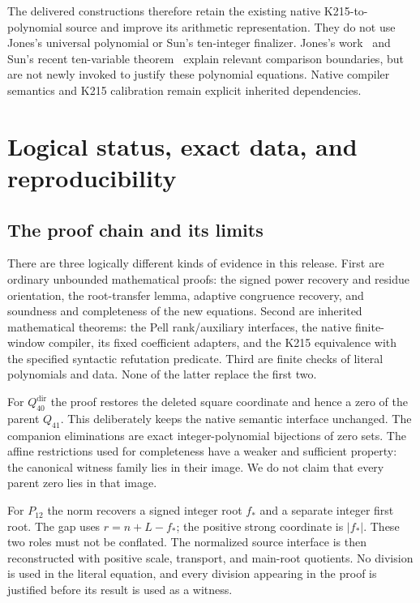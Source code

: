 \documentclass[11pt,letterpaper]{article}
\theoremstyle{remark}
\begin{document}
The delivered constructions therefore retain the existing native
K215-to-polynomial source and improve its arithmetic representation.
They do not use Jones's universal polynomial or Sun's ten-integer
finalizer.  Jones's work~\cite{jones} and Sun's recent ten-variable
theorem~\cite{sun} explain relevant comparison boundaries, but are not
newly invoked to justify these polynomial equations.  Native
compiler semantics and K215 calibration remain explicit inherited
dependencies.





\section{Logical status, exact data, and reproducibility}
\label{sec:evidence}

\subsection{The proof chain and its limits}

There are three logically different kinds of evidence in this release.
First are ordinary unbounded mathematical proofs: the signed power
recovery and residue orientation, the root-transfer lemma, adaptive
congruence recovery, and soundness and completeness of the new
equations.  Second are inherited mathematical theorems: the Pell
rank/auxiliary interfaces, the native finite-window compiler, its fixed
coefficient adapters, and the K215 equivalence with the specified
syntactic refutation predicate.  Third are finite checks of literal
polynomials and data.  None of the latter replace the first two.

For $Q_{40}^{\mathrm{dir}}$ the proof restores the deleted square coordinate and hence
a zero of the parent $Q_{41}$.  This deliberately keeps the native
semantic interface unchanged.  The companion eliminations are exact
integer-polynomial bijections of zero sets.  The affine restrictions
used for completeness have a weaker and sufficient property: the
canonical witness family lies in their image.  We do not claim that
every parent zero lies in that image.

For $P_{12}$ the norm recovers a signed integer root $f_*$ and a
separate integer first root.  The gap uses $r=n+L-f_*$; the positive
strong coordinate is $|f_*|$.  These two roles must not be conflated.
The normalized source interface is then reconstructed with positive
scale, transport, and main-root quotients.  No division is used in the
literal equation, and every division appearing in the proof is
justified before its result is used as a witness.
\end{document}

